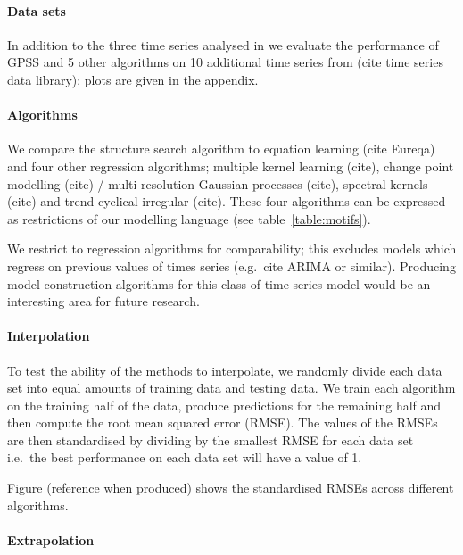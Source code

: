 \documentclass{article}
\def\ie{i.e.\ }
\def\eg{e.g.\ }
\begin{document}
\paragraph{Data sets}

In addition to the three time series analysed in \cite{DuvLloGroetal13} we evaluate the performance of GPSS and 5 other algorithms on 10 additional time series from (cite time series data library); plots are given in the appendix.

\paragraph{Algorithms}

We compare the structure search algorithm to equation learning (cite Eureqa) and four other regression algorithms; multiple kernel learning (cite), change point modelling (cite) / multi resolution Gaussian processes (cite), spectral kernels (cite) and trend-cyclical-irregular (cite).
These four algorithms can be expressed as restrictions of our modelling language (see table~\ref{table:motifs}).

We restrict to regression algorithms for comparability; this excludes models which regress on previous values of times series (\eg cite ARIMA or similar).
Producing model construction algorithms for this class of time-series model would be an interesting area for future research.

\paragraph{Interpolation}

To test the ability of the methods to interpolate, we randomly divide each data set into equal amounts of training data and testing data.
We train each algorithm on the training half of the data, produce predictions for the remaining half and then compute the root mean squared error (RMSE).
The values of the RMSEs are then standardised by dividing by the smallest RMSE for each data set \ie the best performance on each data set will have a value of 1.

Figure (reference when produced) shows the standardised RMSEs across different algorithms.

\paragraph{Extrapolation}
\end{document}
